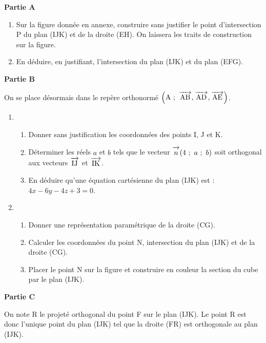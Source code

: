 \documentclass[10pt]{article}
\newcommand{\vect}[1]{\overrightarrow{\,\mathstrut#1\,}}
\begin{document}
\bigskip

\textbf{Partie A}

\medskip

\begin{enumerate}
\item Sur la figure donnée en annexe, construire sans justifier le point d'intersection P du plan (IJK) et
de la droite (EH). On laissera les traits de construction sur la figure.
\item  En déduire, en justifiant, l'intersection du plan (IJK) et du plan (EFG).
\end{enumerate}
 
\bigskip

\textbf{Partie B}

\medskip

On se place désormais dans le repère orthonormé $\left(\text{A}~;~\vect{\text{AB}}, \vect{\text{AD}}, \vect{\text{AE}}\right)$.

\medskip

\begin{enumerate}
\item 
	\begin{enumerate}
		\item Donner sans justification les coordonnées des points I, J et K.
		\item Déterminer les réels $a$ et $b$ tels que le vecteur $\vect{n} (4~;~a~;~b)$ soit orthogonal aux vecteurs $\vect{\text{IJ}}$ et $\vect{\text{IK}}$.
		\item  En déduire qu'une équation cartésienne du plan (IJK) est : $4x - 6y - 4z + 3 = 0$.
	\end{enumerate}
\item 
	\begin{enumerate}
		\item Donner une représentation paramétrique de la droite (CG).
		\item Calculer les coordonnées du point N, intersection du plan (IJK) et de la droite (CG).
		\item Placer le point N sur la figure et construire en couleur la section du cube par le plan (IJK).
	\end{enumerate}
\end{enumerate}

\bigskip

\textbf{Partie C}

\medskip

On note R le projeté orthogonal du point F sur le plan (IJK). Le point R est donc l'unique point du
plan (IJK) tel que la droite (FR) est orthogonale au plan (IJK).
\end{document}
